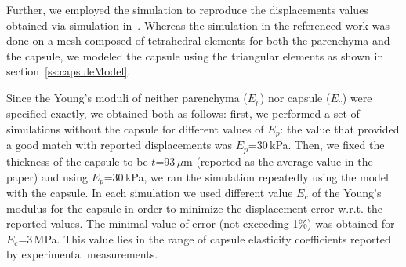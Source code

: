 Further, we employed the simulation to reproduce the displacements values obtained via simulation in~\cite{Hollenstein2006,Nava2008}.
Whereas the simulation in the referenced work was done on a mesh composed of tetrahedral elements for both the parenchyma 
and the capsule, we modeled the capsule using the triangular elements as shown in section~\ref{ss:capsuleModel}.

Since the Young's moduli of neither parenchyma ($E_p$) nor capsule ($E_c$) were specified exactly, we obtained both as follows: first, 
we performed a set of simulations without the capsule for different values of $E_p$: the value that provided a good match 
with reported displacements was $E_p$=30\,kPa. 
Then, we fixed the thickness of the capsule to be $t$=93\,$\mu$m (reported as the average value in the paper) and 
using $E_p$=30\,kPa, we ran the simulation repeatedly using the model with the capsule. In each simulation we 
used different value $E_c$ of the Young's modulus for the capsule in order to minimize the displacement error w.r.t. the 
reported values. The minimal value of error (not exceeding 1\%) was obtained for $E_c$=3\,MPa. This 
value lies in the range of capsule elasticity coefficients reported by experimental measurements.


